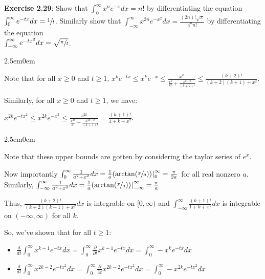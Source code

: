 \documentclass{book}
\newcommand{\exTwoP}{%
   \color{RedViolet}%
   \fontsize{13}{15}\selectfont%
}
\newcommand{\exPPP}{%
   \color{VioletRed}%
   \fontsize{12}{14}\selectfont%
}
\newenvironment{myIndent}{%
   \begin{adjustwidth}{2.5em}{0em}%
}{%
   \end{adjustwidth}%
}
\newcommand{\blab}[1]{\textbf{#1}}
\newcommand{\retTwo}{\hfill\bigbreak}
\begin{document}
\blab{Exercise 2.29}: Show that $\int_0^\infty x^n e^{-x}dx = n!$ by differentiating the equation $\int_0^\infty e^{-tx}dx = \sfrac{1}{t}$. Similarly show that $\int_{-\infty}^\infty x^{2n}e^{-x^2}dx = \frac{(2n)!\sqrt{\pi}}{4^n n!}$ by differentiating the equation\\ $\int_{-\infty}^\infty e^{-tx^2}dx = \sqrt{\sfrac{\pi}{t}}$.

\begin{myIndent}\exTwoP

	Note that for all $x \geq 0$ and $t \geq 1$, $x^{k}e^{-tx} \leq x^ke^{-x} \leq \frac{x^k}{\frac{x^k}{k!} + \frac{x^{k+2}}{(k+2)!}} \leq \frac{(k+2)!}{(k+2)(k+1) + x^2}$.\retTwo

	Similarly, for all $x \geq 0$ and $t \geq 1$, we have:
	
	{\centering $x^{2k}e^{-tx^2} \leq x^{2k}e^{-x^2} \leq \frac{x^{2k}}{\frac{x^{2k}}{k!} + \frac{x^{2k+2}}{(k+1)!}} = \frac{(k+1)!}{1 + k + x^2}$.\par}

	\begin{myIndent}\exPPP
		Note that these upper bounds are gotten by considering the taylor series of $e^x$.\retTwo
	\end{myIndent}

	Now importantly $\int_0^\infty\frac{1}{a^2 + x^2}dx = \frac{1}{a}(\arctan(\sfrac{x}{a}))\hspace{-0.2em}\left.\right|_0^\infty = \frac{\pi}{2a}$ for all real nonzero $a$.\\ Similarly, $\int_{-\infty}^\infty \frac{1}{a^2 + x^2}dx = \frac{1}{a}(\arctan(\sfrac{x}{a}))\hspace{-0.2em}\left.\right|_{-\infty}^\infty = \frac{\pi}{a}$\retTwo

	Thus, $\frac{(k+2)!}{(k+2)(k+1) + x^2}dx$ is integrable on $[0, \infty)$ and $\int_{-\infty}^\infty \frac{(k+1)!}{1 + k + x^2}dx$ is integrable on $(-\infty, \infty)$ for all $k$.\retTwo

	So, we've shown that for all $t \geq 1$:
	\begin{itemize}
		\item $\frac{d}{dt}\int_0^\infty x^{k-1}e^{-tx}dx = \int_0^\infty \frac{\partial}{\partial t}x^{k-1}e^{-tx}dx = \int_0^\infty -x^{k}e^{-tx}dx$
		\item $\frac{d}{dt}\int_0^\infty x^{2k - 2}e^{-tx^2}dx = \int_0^\infty \frac{\partial}{\partial t}x^{2k-2}e^{-tx^2}dx = \int_0^\infty -x^{2k}e^{-tx^2}dx$\retTwo
	\end{itemize}


\end{myIndent}
\end{document}

